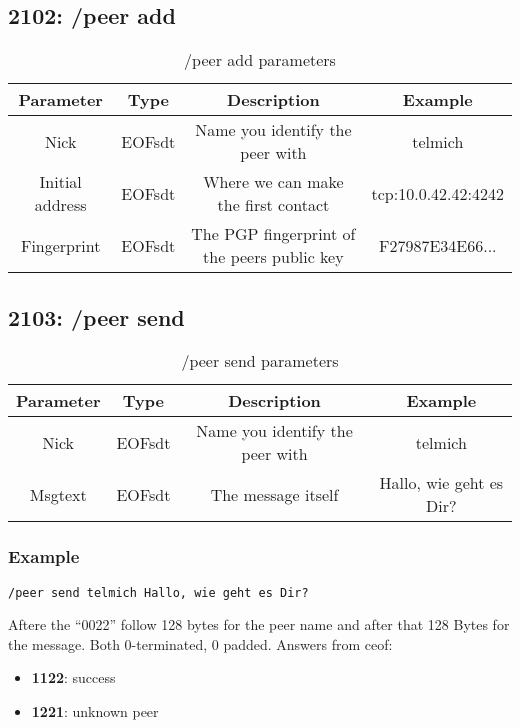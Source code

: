 \documentclass[12pt,a4paper]{book}
\begin{document}
\subsection{2102: /peer add}
%
\begin{longtable}{|c|c|c|c|}
\caption{/peer add parameters}\\
\hline
\textbf{Parameter} & \textbf{Type} & \textbf{Description} & \textbf{Example}\\
\hline
Nick & EOFsdt & Name you identify the peer with & telmich\\
\hline
Initial address & EOFsdt & Where we can make the first contact & tcp:10.0.42.42:4242\\
\hline
Fingerprint & EOFsdt & The PGP fingerprint of the peers public key & F27987E34E66...\\
\hline
\end{longtable}
\subsection{2103: /peer send}
%
\begin{longtable}{|c|c|c|c|}
\caption{/peer send parameters}\\
\hline
\textbf{Parameter} & \textbf{Type} & \textbf{Description} & \textbf{Example}\\
\hline
Nick & EOFsdt & Name you identify the peer with & telmich\\
\hline
Msgtext & EOFsdt & The message itself & Hallo, wie geht es Dir?\\
\hline
\end{longtable}

\subsubsection{Example}
\begin{verbatim}
/peer send telmich Hallo, wie geht es Dir?
\end{verbatim}


Aftere the "`0022"' follow 128 bytes for the peer name
and after that 128 Bytes for the message.
Both 0-terminated, 0 padded.
Answers from ceof:
\begin{itemize}
\item \textbf{1122}: success
\item \textbf{1221}: unknown peer
\end{itemize}
\end{document}

